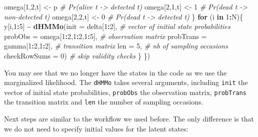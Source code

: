 \documentclass[
  12pt,
]{krantz}
\newenvironment{Shaded}{\begin{snugshade}}{\end{snugshade}}
\newcommand{\AttributeTok}[1]{\textcolor[rgb]{0.13,0.29,0.53}{#1}}
\newcommand{\CommentTok}[1]{\textcolor[rgb]{0.56,0.35,0.01}{\textit{#1}}}
\newcommand{\ControlFlowTok}[1]{\textcolor[rgb]{0.13,0.29,0.53}{\textbf{#1}}}
\newcommand{\DecValTok}[1]{\textcolor[rgb]{0.00,0.00,0.81}{#1}}
\newcommand{\FunctionTok}[1]{\textcolor[rgb]{0.13,0.29,0.53}{\textbf{#1}}}
\newcommand{\NormalTok}[1]{#1}
\newcommand{\OtherTok}[1]{\textcolor[rgb]{0.56,0.35,0.01}{#1}}
\newcommand{\SpecialCharTok}[1]{\textcolor[rgb]{0.81,0.36,0.00}{\textbf{#1}}}
\begin{document}
\begin{Shaded}
\begin{Highlighting}[]
\NormalTok{    omega[}\DecValTok{1}\NormalTok{,}\DecValTok{2}\NormalTok{,t] }\OtherTok{\textless{}{-}}\NormalTok{ p        }\CommentTok{\# Pr(alive t {-}\textgreater{} detected t)}
\NormalTok{    omega[}\DecValTok{2}\NormalTok{,}\DecValTok{1}\NormalTok{,t] }\OtherTok{\textless{}{-}} \DecValTok{1}        \CommentTok{\# Pr(dead t {-}\textgreater{} non{-}detected t)}
\NormalTok{    omega[}\DecValTok{2}\NormalTok{,}\DecValTok{2}\NormalTok{,t] }\OtherTok{\textless{}{-}} \DecValTok{0}        \CommentTok{\# Pr(dead t {-}\textgreater{} detected t)}
\NormalTok{  \}}
  \ControlFlowTok{for}\NormalTok{ (i }\ControlFlowTok{in} \DecValTok{1}\SpecialCharTok{:}\NormalTok{N)\{}
\NormalTok{    y[i,}\DecValTok{1}\SpecialCharTok{:}\DecValTok{5}\NormalTok{] }\SpecialCharTok{\textasciitilde{}} \FunctionTok{dHMMo}\NormalTok{(}\AttributeTok{init =}\NormalTok{ delta[}\DecValTok{1}\SpecialCharTok{:}\DecValTok{2}\NormalTok{], }\CommentTok{\# vector of initial state probabilities}
                     \AttributeTok{probObs =}\NormalTok{ omega[}\DecValTok{1}\SpecialCharTok{:}\DecValTok{2}\NormalTok{,}\DecValTok{1}\SpecialCharTok{:}\DecValTok{2}\NormalTok{,}\DecValTok{1}\SpecialCharTok{:}\DecValTok{5}\NormalTok{], }\CommentTok{\# observation matrix}
                     \AttributeTok{probTrans =}\NormalTok{ gamma[}\DecValTok{1}\SpecialCharTok{:}\DecValTok{2}\NormalTok{,}\DecValTok{1}\SpecialCharTok{:}\DecValTok{2}\NormalTok{], }\CommentTok{\# transition matrix}
                     \AttributeTok{len =} \DecValTok{5}\NormalTok{, }\CommentTok{\# nb of sampling occasions}
                     \AttributeTok{checkRowSums =} \DecValTok{0}\NormalTok{) }\CommentTok{\# skip validity checks}
\NormalTok{  \}}
\NormalTok{\})}
\end{Highlighting}
\end{Shaded}

You may see that we no longer have the states in the code as we use the marginalized likelihood. The \texttt{dHMMo} takes several arguments, including \texttt{init} the vector of initial state probabilities, \texttt{probObs} the observation matrix, \texttt{probTrans} the transition matrix and \texttt{len} the number of sampling occasions.

Next steps are similar to the workflow we used before. The only difference is that we do not need to specify initial values for the latent states:
\end{document}
